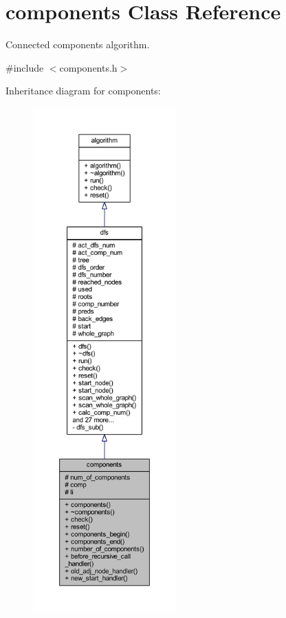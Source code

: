 \hypertarget{classcomponents}{}\section{components Class Reference}
\label{classcomponents}


Connected components algorithm.  




{\ttfamily \#include $<$components.\+h$>$}



Inheritance diagram for components\+:\nopagebreak
\begin{figure}[H]
\begin{center}
\leavevmode
\includegraphics[height=550pt]{classcomponents__inherit__graph}
\end{center}
\end{figure}


